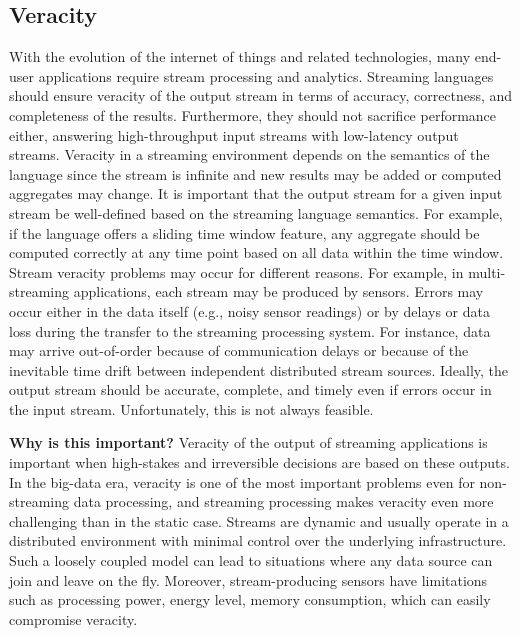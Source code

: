 \subsection{Veracity}\label{sec:veracity}



With the evolution of the internet of things and related technologies,
many end-user applications require stream processing and analytics.
Streaming languages should ensure veracity of the output stream in
terms of accuracy, correctness, and completeness of the results.
Furthermore, they should not sacrifice performance either, answering
high-throughput input streams with low-latency output streams.
Veracity in a streaming environment depends on the semantics of the
language since the stream is infinite and new results may be added or
computed aggregates may change. It is important that the output stream
for a given input stream be well-defined based on the streaming
language semantics. For example, if the language offers a sliding
time window feature, any aggregate should be computed correctly at
any time point based on all data within the time window.
%
Stream veracity problems may occur for different reasons. For example,
in multi-streaming applications, each stream may be produced by
sensors. Errors may occur either in the data itself (e.g., noisy
sensor readings) or by delays or data loss during the transfer to the
streaming processing system. For instance, data may arrive
out-of-order because of communication delays or because of the
inevitable time drift between independent distributed stream sources.
Ideally, the output stream should be accurate, complete, and timely
even if errors occur in the input stream.  Unfortunately, this is not
always feasible.

\textbf{Why is this important?}
%
Veracity of the output of streaming applications is important when
high-stakes and irreversible decisions are based on these outputs.  In
the big-data era, veracity is one of the most important problems even
for non-streaming data processing, and streaming processing makes
veracity even more challenging than in the static case. Streams are
dynamic and usually operate in a distributed environment
with minimal control over the underlying infrastructure. Such a
loosely coupled model can lead to situations where any data source can
join and leave on the fly. Moreover, stream-producing sensors
have limitations such as processing power, energy level, memory
consumption, which can easily compromise veracity.

